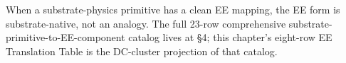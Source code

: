 \vspace{1em}

\noindent
When a substrate-physics primitive has a clean EE mapping, the EE form is substrate-native, not an analogy. The full 23-row comprehensive substrate-primitive-to-EE-component catalog lives at  \S 4; this chapter's eight-row EE Translation Table is the DC-cluster projection of that catalog.
%
%
